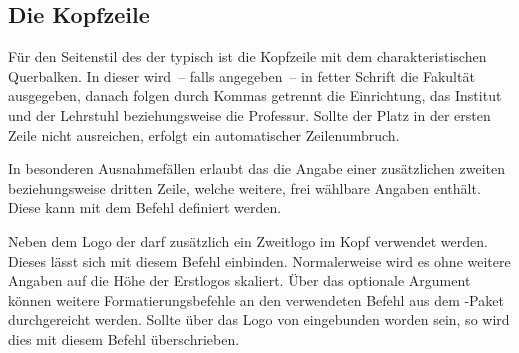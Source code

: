 \documentclass[%
  english,ngerman,%
  headings=optiontoheadandtoc,captions=tableheading,numbers=noenddot,%
  chapterpage,cdfoot,%
]{tudscrman}
\begin{document}
\subsection{Die Kopfzeile}
%
\begin{Declaration}{}
\begin{Declaration}{}
\begin{Declaration}{}
\begin{Declaration}{}
\begin{Declaration}{}
\printdeclarationlist%
%
%
Für den Seitenstil des \CDs der \TnUD typisch ist die Kopfzeile mit dem 
charakteristischen Querbalken. In dieser wird~-- falls angegeben~-- in fetter 
Schrift die Fakultät ausgegeben, danach folgen durch Kommas getrennt die 
Einrichtung, das Institut und der Lehrstuhl beziehungsweise die Professur. 
Sollte der Platz in der ersten Zeile nicht ausreichen, erfolgt ein automatischer 
Zeilenumbruch.

In besonderen Ausnahmefällen erlaubt das \CD die Angabe einer zusätzlichen
zweiten beziehungsweise dritten Zeile, welche weitere, frei wählbare Angaben 
enthält. Diese kann mit dem Befehl  
definiert werden.
\end{Declaration}
\end{Declaration}
\end{Declaration}
\end{Declaration}
\end{Declaration}

\begin{Declaration}{%
  \LParameter{}%
}
\printdeclarationlist%
%
%
Neben dem Logo der \TnUD darf zusätzlich ein Zweitlogo im Kopf verwendet 
werden. Dieses lässt sich mit diesem Befehl einbinden. Normalerweise wird es
ohne weitere Angaben auf die Höhe der Erstlogos skaliert. Über das optionale 
Argument können weitere Formatierungsbefehle an den verwendeten Befehl 
 aus dem -Paket durchgereicht werden.
Sollte über  das Logo von \DDC eingebunden worden sein, so wird dies 
mit diesem Befehl überschrieben.
\end{Declaration}
\end{document}
